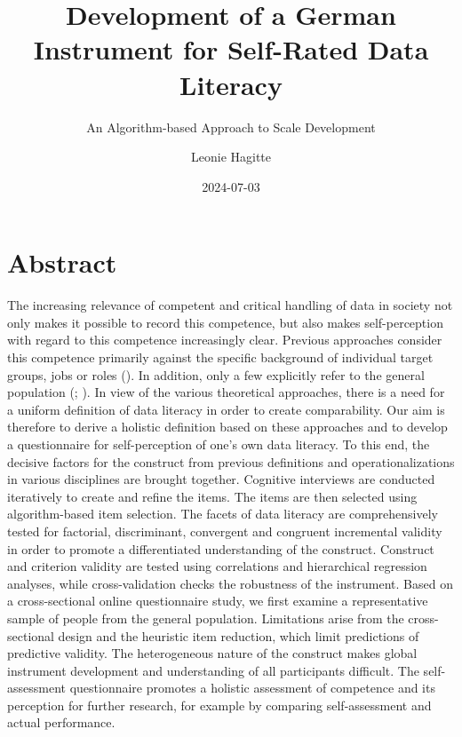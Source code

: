 \documentclass[
  12pt,
  a4paper,
  twoside]{article}
\title{Development of a German Instrument for Self-Rated Data Literacy}
\subtitle{An Algorithm-based Approach to Scale Development}
\author{Leonie Hagitte}
\date{2024-07-03}
\begin{document}
\maketitle

\newpage\null\thispagestyle{empty}\newpage

\section*{Abstract}\label{abstract}

The increasing relevance of competent and critical handling of data in
society not only makes it possible to record this competence, but also
makes self-perception with regard to this competence increasingly clear.
Previous approaches consider this competence primarily against the
specific background of individual target groups, jobs or roles
(). In addition, only a few
explicitly refer to the general population
(;
). In view of the various
theoretical approaches, there is a need for a uniform definition of data
literacy in order to create comparability. Our aim is therefore to
derive a holistic definition based on these approaches and to develop a
questionnaire for self-perception of one's own data literacy. To this
end, the decisive factors for the construct from previous definitions
and operationalizations in various disciplines are brought together.
Cognitive interviews are conducted iteratively to create and refine the
items. The items are then selected using algorithm-based item selection.
The facets of data literacy are comprehensively tested for factorial,
discriminant, convergent and congruent incremental validity in order to
promote a differentiated understanding of the construct. Construct and
criterion validity are tested using correlations and hierarchical
regression analyses, while cross-validation checks the robustness of the
instrument. Based on a cross-sectional online questionnaire study, we
first examine a representative sample of people from the general
population. Limitations arise from the cross-sectional design and the
heuristic item reduction, which limit predictions of predictive
validity. The heterogeneous nature of the construct makes global
instrument development and understanding of all participants difficult.
The self-assessment questionnaire promotes a holistic assessment of
competence and its perception for further research, for example by
comparing self-assessment and actual performance.
\end{document}
